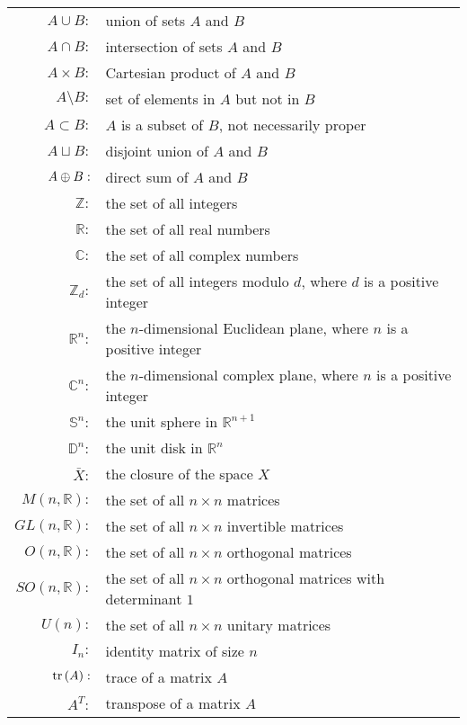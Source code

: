 \begin{longtable}{r l}
    $A\cup B:$ & union of sets $A$ and $B$ \\[\rs]
    $A\cap B:$ & intersection of sets $A$ and $B$ \\[\rs]
    $A\times B:$ & Cartesian product of $A$ and $B$ \\[\rs]
    $A\setminus B:$ & set of elements in $A$ but not in $B$ \\[\rs] 
    $A \subset B:$ & $A$ is a subset of $B$, not necessarily proper \\[\rs] 
    $A \sqcup B:$ & disjoint union of $A$ and $B$  \\[\rs] 
    $A \oplus B:$ & direct sum of $A$ and $B$  \\[\rs] 
    $\mathbb{Z}: $ & the set of all integers\\[\rs]
    $\mathbb{R}: $ & the set of all real numbers\\[\rs]
    $\mathbb{C}: $ & the set of all complex numbers\\[\rs]
    $\mathbb{Z}_d: $ & the set of all integers modulo $d$, where $d$ is a positive integer \\[\rs]
    $\mathbb{R}^n: $ & the $n$-dimensional Euclidean plane, where $n$ is a positive integer\\[\rs]
    $\mathbb{C}^n: $ & the $n$-dimensional complex plane, where $n$ is a positive integer\\[\rs]
    $\mathbb{S}^n: $ & the unit sphere in $\mathbb{R}^{n+1}$ \\[\rs]
    $\mathbb{D}^n: $ & the unit disk in $\mathbb{R}^{n}$ \\[\rs]
    $\bar{X}: $ & the closure of the space $X$  \\[\rs]
    $M(n,\mathbb{R}): $ & the set of all $n\times n$ matrices \\[\rs]
    $GL(n,\mathbb{R}): $ & the set of all $n\times n$ invertible matrices \\[\rs]
    $O(n,\mathbb{R}): $ & the set of all $n\times n$ orthogonal matrices \\[\rs]
    $SO(n,\mathbb{R}): $ & the set of all $n\times n$ orthogonal matrices with determinant $1$ \\[\rs]
    $U(n): $ & the set of all $n\times n$ unitary matrices \\[\rs]
    $I_n: $ & identity matrix of size $n$ \\[\rs]
    $\mathrm{tr}\left( A \right):$ & trace of a matrix $A$ \\[\rs]
    $A^T:$ & transpose of a matrix $A$ \\[\rs]

\end{longtable}
